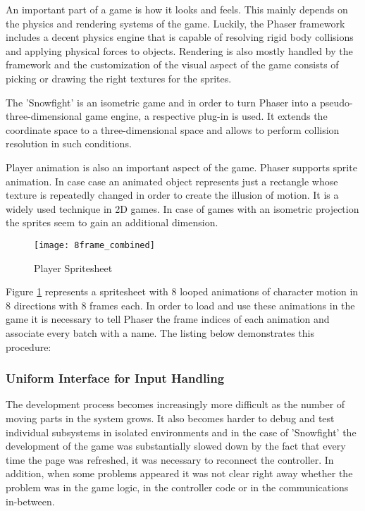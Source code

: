 An important part of a game is how it looks and feels. This mainly depends on
the physics and rendering systems of the game. Luckily, the Phaser framework
includes a decent physics engine that is capable of resolving rigid body
collisions and applying physical forces to objects. Rendering is also mostly
handled by the framework and the customization of the visual aspect of the game
consists of picking or drawing the right textures for the sprites.

The 'Snowfight' is an isometric game and in order to turn Phaser into a pseudo-
three-dimensional game engine, a respective plug-in is used. It extends the
coordinate space to a three-dimensional space and allows to perform collision
resolution in such conditions.



Player animation is also an important aspect of the game. Phaser supports sprite
animation. In case case an animated object represents just a rectangle whose
texture is repeatedly changed in order to create the illusion of motion. It is
a widely used technique in 2D games. In case of games with an isometric
projection the sprites seem to gain an additional dimension.

\begin{figure}[!h]
\centering
\texttt{[image: 8frame\_combined]}
\caption{Player Spritesheet}\label{fig:knight_sprite}
\end{figure}

Figure \ref{fig:knight_sprite} represents a spritesheet with 8 looped animations
of character motion in 8 directions with 8 frames each. In order to load and use
these animations in the game it is necessary to tell Phaser the frame indices of
each animation and associate every batch with a name. The listing below
demonstrates this procedure:



\subsubsection{Uniform Interface for Input Handling}

The development process becomes increasingly more difficult as the number of
moving parts in the system grows. It also becomes harder to debug and test
individual subsystems in isolated environments and in the case of 'Snowfight'
the development of the game was substantially slowed down by the fact that every
time the page was refreshed, it was necessary to reconnect the controller. In
addition, when some problems appeared it was not clear right away whether the
problem was in the game logic, in the controller code or in the communications
in-between.

